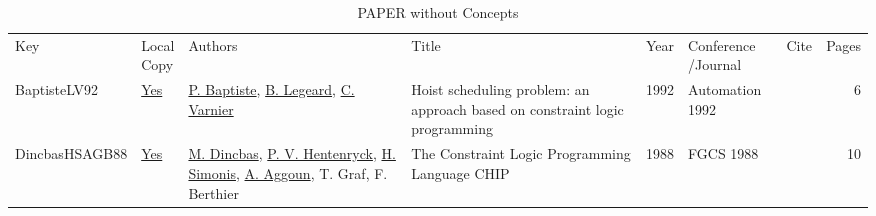 {\scriptsize
\begin{longtable}{llp{5cm}p{10cm}rp{3cm}lr}
\rowcolor{white}\caption{PAPER without Concepts}\\ \toprule
\rowcolor{white}Key & \shortstack{Local\\Copy} & Authors & Title & Year & \shortstack{Conference\\/Journal} & Cite & Pages\\ \midrule
\endhead
\bottomrule
\endfoot
BaptisteLV92 & \href{../works/BaptisteLV92.pdf}{Yes} & \hyperref[auth:a692]{P. Baptiste}, \hyperref[auth:a693]{B. Legeard}, \hyperref[auth:a691]{C. Varnier} & Hoist scheduling problem: an approach based on constraint logic programming & 1992 & Automation 1992 & \cite{BaptisteLV92} & 6\\DincbasHSAGB88 & \href{../works/DincbasHSAGB88.pdf}{Yes} & \hyperref[auth:a716]{M. Dincbas}, \hyperref[auth:a148]{P. V. Hentenryck}, \hyperref[auth:a17]{H. Simonis}, \hyperref[auth:a724]{A. Aggoun}, T. Graf, F. Berthier & The Constraint Logic Programming Language {CHIP} & 1988 & FGCS 1988 & \cite{DincbasHSAGB88} & 10\\\end{longtable}
}

